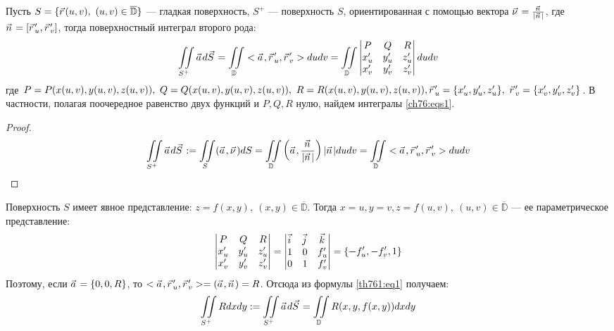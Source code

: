 \begin{theorem}
  Пусть $S = \{\pvec r(u, v), \ (u, v) \in \overline{\mathbb{D}}\}$ --- гладкая
  поверхность, $S^+$ --- поверхность $S$, ориентированная с помощью вектора
  $\pvec \nu = \frac{\pvec n}{|\pvec n|}$, где $\pvec n = [\pvec r_u', \pvec
  r_v']$, тогда поверхностный интеграл второго рода:
  \begin{gather}
    \iint\limits_{S^+} \pvec a d \pvec S = \iint\limits_{\mathbb{D}} <\pvec a,
    \pvec r_u', \pvec r_v'> du dv = \iint\limits_{\mathbb{D}}
    \begin{vmatrix}
      P & Q & R \\
      x_u' & y_u' & z_u' \\
      x_v' & y_v' & z_v'
    \end{vmatrix}
    du dv
    \label{th761:eq1}
  \end{gather}
  где $P = P(x(u, v), y(u, v), z(u, v)), \ Q = Q(x(u, v), y(u, v), z(u,v)), \ R =
  R(x(u, v), y(u, v), z(u,v)), \\ \pvec r_u' = \{x_u', y_u', z_u'\}, \ \pvec r_v' =
  \{x_v', y_v', z_v'\}$. В частности, полагая поочередное равенство двух
  функций и $P, Q, R$ нулю, найдем интегралы \eqref{ch76:eqs1}.
\end{theorem}

\begin{proof}
  \begin{gather*}
    \iint\limits_{S^+} \pvec a d \pvec S := \iint\limits_S (\pvec a, \pvec \nu)
    dS = \iint\limits_{\mathbb{D}} \left(\pvec a, \frac{\pvec n}{|\pvec n|}
    \right) |\pvec n| du dv = \iint\limits_{\mathbb{D}} <\pvec a, \pvec r_u',
    \pvec r_v'> du dv
  \end{gather*}
\end{proof}

\begin{example}
  \label{ex761}
  Поверхность $S$ имеет явное представление: $z = f(x, y), \ (x, y) \in
  \overline{\mathbb{D}}$. Тогда $x = u, y = v, z = f(u, v), \ (u, v) \in
  \overline{\mathbb{D}}$ --- ее параметрическое представление:
  \begin{gather}
    \begin{vmatrix}
      P & Q & R \\
      x_u' & y_u' & z_u' \\
      x_v' & y_v' & z_v'
    \end{vmatrix} =
    \begin{vmatrix}
      \pvec i & \pvec j & \pvec k \\
      1 & 0 & f_u' \\
      0 & 1 & f_v'
    \end{vmatrix} =
    \{-f_u', -f_v', 1\}
    \label{ex761:eq1}
  \end{gather}
  Поэтому, если $\pvec a = \{0, 0, R\}$, то $<\pvec a, \pvec r_u', \pvec r_v'>
  = (\pvec a, \pvec n) = R$. Отсюда из формулы \eqref{th761:eq1} получаем:
  \begin{gather}
    \iint\limits_{S^+} R dx dy := \iint\limits_{S^+} \pvec a d \pvec S =
    \iint\limits_{\mathbb{D}} R(x, y, f(x, y)) dx dy
    \label{ex761:eq2}
  \end{gather}
\end{example}

